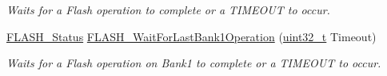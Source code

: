 \begin{DoxyCompactItemize}
\begin{DoxyCompactList}\small\item\em Waits for a Flash operation to complete or a T\+I\+M\+E\+O\+UT to occur. \end{DoxyCompactList}\item 
\hyperlink{group___f_l_a_s_h___exported___types_gadc63a6f3404ff1f71229a66915e9cdc0}{F\+L\+A\+S\+H\+\_\+\+Status} \hyperlink{group___f_l_a_s_h___private___functions_ga470d345c2ea4304f899aa988bdd23824}{F\+L\+A\+S\+H\+\_\+\+Wait\+For\+Last\+Bank1\+Operation} (\hyperlink{_p_e___types_8h_a33594304e786b158f3fb30289278f5af}{uint32\+\_\+t} Timeout)
\begin{DoxyCompactList}\small\item\em Waits for a Flash operation on Bank1 to complete or a T\+I\+M\+E\+O\+UT to occur. \end{DoxyCompactList}\end{DoxyCompactItemize}
